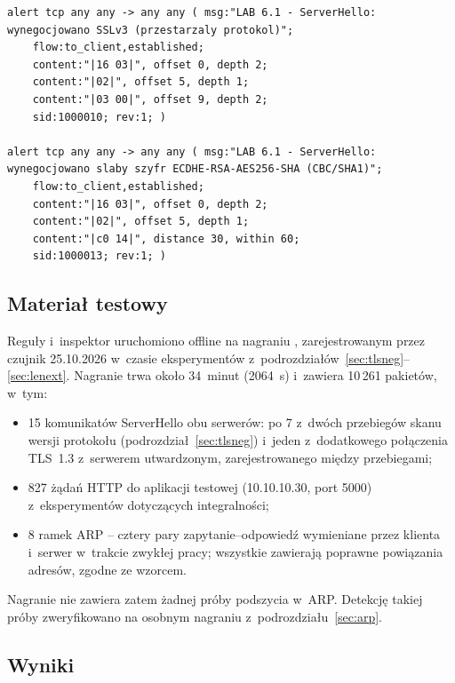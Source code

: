 \begin{lstlisting}[float=htbp, caption={Reguły własne czujnika do wykrywania przestarzałych parametrów sesji TLS (fragment pliku \kod{local.rules})}, label={lst:reguly}]
alert tcp any any -> any any ( msg:"LAB 6.1 - ServerHello: wynegocjowano SSLv3 (przestarzaly protokol)";
    flow:to_client,established;
    content:"|16 03|", offset 0, depth 2;
    content:"|02|", offset 5, depth 1;
    content:"|03 00|", offset 9, depth 2;
    sid:1000010; rev:1; )

alert tcp any any -> any any ( msg:"LAB 6.1 - ServerHello: wynegocjowano slaby szyfr ECDHE-RSA-AES256-SHA (CBC/SHA1)";
    flow:to_client,established;
    content:"|16 03|", offset 0, depth 2;
    content:"|02|", offset 5, depth 1;
    content:"|c0 14|", distance 30, within 60;
    sid:1000013; rev:1; )
\end{lstlisting}

\subsection*{Materiał testowy}

Reguły i~inspektor uruchomiono offline na nagraniu , zarejestrowanym przez czujnik 25.10.2026 w~czasie eksperymentów z~podrozdziałów~\ref{sec:tlsneg}--\ref{sec:lenext}. Nagranie trwa około 34~minut (2064~s) i~zawiera 10\,261 pakietów, w~tym:
\begin{itemize}
  \item 15 komunikatów ServerHello obu serwerów: po 7 z~dwóch przebiegów skanu wersji protokołu (podrozdział~\ref{sec:tlsneg}) i~jeden z~dodatkowego połączenia TLS~1.3 z~serwerem utwardzonym, zarejestrowanego między przebiegami;
  \item 827 żądań HTTP  do aplikacji testowej (10.10.10.30, port 5000) z~eksperymentów dotyczących integralności;
  \item 8 ramek ARP -- cztery pary zapytanie--odpowiedź wymieniane przez klienta i~serwer w~trakcie zwykłej pracy; wszystkie zawierają poprawne powiązania adresów, zgodne ze wzorcem.
\end{itemize}
Nagranie nie zawiera zatem żadnej próby podszycia w~ARP. Detekcję takiej próby zweryfikowano na osobnym nagraniu  z~podrozdziału~\ref{sec:arp}.

\subsection*{Wyniki}

